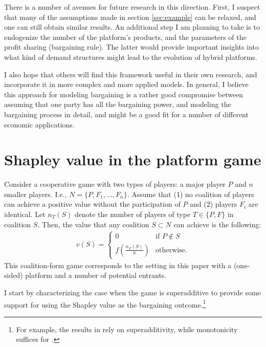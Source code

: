 \documentclass[a4paper]{article}
\begin{document}
There is a number of avenues for future research in this direction.
First, I suspect that many of the assumptions made in section \cref{sec:example} can be relaxed, and one can still obtain similar results.
An additional step I am planning to take is to endogenize the number of the platform's products, and the parameters of the profit sharing (bargaining rule).
The latter would provide important insights into what kind of demand structures might lead to the evolution of hybrid platforms.

I also hope that others will find this framework useful in their own research, and incorporate it in more complex and more applied models.
In general, I believe this approach for modeling bargaining is a rather good compromise between assuming that one party has all the bargaining power, and modeling the bargaining process in detail, and might be a good fit for a number of different economic applications.


\appendix

\printbibliography


\section{Shapley value in the platform game}

Consider a cooperative game with two types of players: a major player $P$ and $n$ smaller players.
I.e., $N = \{P, F_1, \dots, F_n\}$.
Assume that (1) no coalition of players can achieve a positive value without the participation of $P$ and (2) players $F_i$ are identical.
Let $n_T(S)$ denote the number of players of type $T \in \{P, F\}$ in coalition $S$. Then, the value that any coalition $S \subset N$ can achieve is the following:
\begin{align*}
    v(S) = \begin{cases}
        0                              & \text{if } P \notin S \\
        f\left(\frac{n_F(S)}{n}\right) & \text{otherwise}.
    \end{cases}
\end{align*}
This coalition-form game corresponds to the setting in this paper with a (one-sided) platform and a number of potential entrants.

I start by characterizing the case when the game is superadditive to provide some support for using the Shapley value as the bargaining outcome.\footnote{For example, the results in \textcite{gul1989bargaining} rely on superadditivity, while monotonicity suffices for \textcite[]{hart1996bargaining}.}
\end{document}
